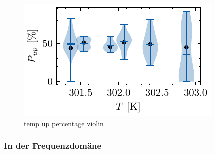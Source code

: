 \documentclass[main.tex]{subfiles}
\begin{document}
\begin{figure}[H]
    \centering
    \includegraphics{bilder/plots/temp_comparison/up_percentage_violin.pdf}
    \caption{temp up percentage violin}\label{fig:temp-up-percentage-violin}
\end{figure}

\subsubsection{In der Frequenzdomäne}
\end{document}
